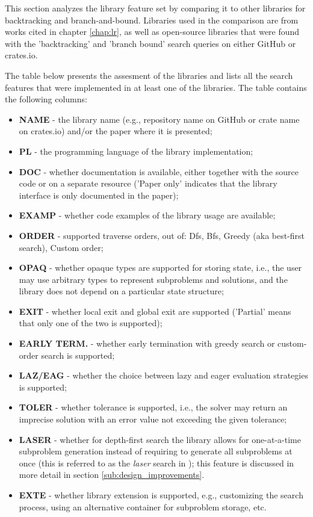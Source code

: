 \label{sec:feature_cmp}

This section analyzes the library feature set by comparing it to other libraries for
backtracking and branch-and-bound. Libraries used in the comparison are from works
cited in chapter \ref{chap:lr}, as well as open-source libraries that were found
with the 'backtracking' and 'branch bound' search queries on either GitHub
or crates.io.

The table below presents the assesment of the libraries and lists all the search features
that were implemented in at least one of the libraries. The table contains the following
columns:
\begin{itemize}
 \item \textbf{NAME} - the library name (e.g., repository name on GitHub
      or crate name on crates.io) and/or the paper where it is presented;
 \item \textbf{PL} - the programming language of the library implementation;
 \item \textbf{DOC} - whether documentation is available, either together with the source code
      or on a separate resource ('Paper only' indicates that the library interface
      is only documented in the paper);
 \item \textbf{EXAMP} - whether code examples of the library usage are available;
 \item \textbf{ORDER} - supported traverse orders, out of:
      Dfs, Bfs, Greedy (aka best-first search), Custom order;
 \item \textbf{OPAQ} - whether opaque types are supported for storing state, i.e., the user
      may use arbitrary types to represent subproblems and solutions, and the library does
      not depend on a particular state structure;
 \item \textbf{EXIT} - whether local exit and global exit \cite{narkawicz2013formalnasa}
      are supported
      ('Partial' means that only one of the two is supported);
 \item \textbf{EARLY TERM.} - whether early termination with greedy search or custom-order
      search is supported;
 \item \textbf{LAZ/EAG} - whether the choice between lazy and eager evaluation strategies
      is supported;
 \item \textbf{TOLER} - whether tolerance is supported, i.e., the solver may return an
      imprecise solution with an error value not exceeding the given tolerance;
 \item \textbf{LASER} - whether for depth-first search the library allows for one-at-a-time
      subproblem generation instead of requiring to generate all subproblems at once
      (this is referred to as the \emph{laser} search in \cite{johnson1988modular});
      this feature is discussed in more detail in section \ref{sub:design_improvements}.
 \item \textbf{EXTE} - whether library extension is supported, e.g., customizing the
      search process, using an alternative container for subproblem storage, etc.
\end{itemize}

